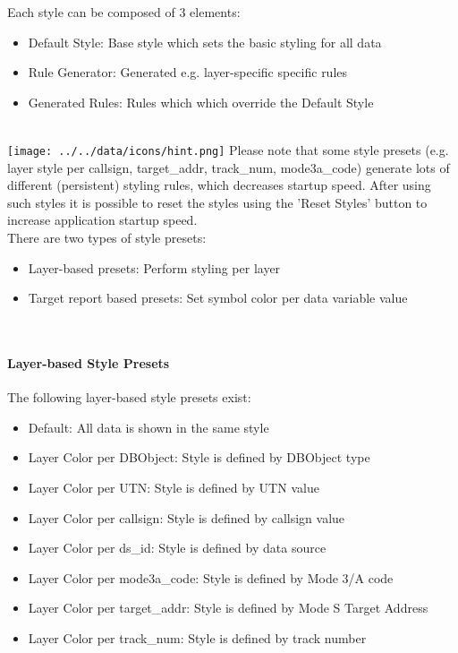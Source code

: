 Each style can be composed of 3 elements:
\begin{itemize}
 \item Default Style: Base style which sets the basic styling for all data
 \item Rule Generator: Generated e.g. layer-specific specific rules
 \item Generated Rules: Rules which which override the Default Style
\end{itemize}
\  \\

\texttt{[image: ../../data/icons/hint.png]} Please note that some style presets (e.g. layer style per callsign, target\_addr, track\_num, mode3a\_code) generate lots of different (persistent) styling rules, which decreases startup speed. After using such styles it is possible to reset the styles using the 'Reset Styles' button to increase application startup speed. \\

There are two types of style presets:
\begin{itemize}
 \item Layer-based presets: Perform styling per layer
 \item Target report based presets: Set symbol color per data variable value
\end{itemize}
\  \\

\paragraph{Layer-based Style Presets}
The following layer-based style presets exist:
\begin{itemize}
 \item Default: All data is shown in the same style
 \item Layer Color per DBObject: Style is defined by DBObject type
 \item Layer Color per UTN: Style is defined by UTN value
 \item Layer Color per callsign: Style is defined by callsign value
 \item Layer Color per ds\_id: Style is defined by data source
 \item Layer Color per mode3a\_code: Style is defined by Mode 3/A code
 \item Layer Color per target\_addr: Style is defined by Mode S Target Address
 \item Layer Color per track\_num: Style is defined by track number
\end{itemize}
\  \\

